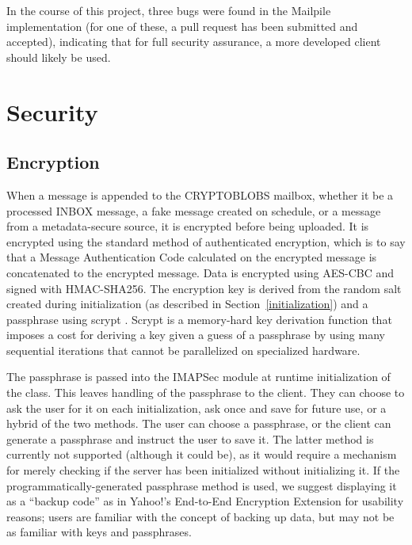 \documentclass[pageno]{jpaper}
\newcommand{\project}{IMAPSec }
\begin{document}
In the course of this project, three bugs were found in the Mailpile implementation (for one of these, a pull request has been submitted and accepted), indicating that for full security assurance, a more developed client should likely be used.




\section{Security}

\label{encryption}
\subsection{Encryption}

When a message is appended to the CRYPTOBLOBS mailbox, whether it be a processed INBOX message, a fake message created on schedule, or a message from a metadata-secure source, it is encrypted before being uploaded. It is encrypted using the standard method of authenticated encryption, which is to say that a Message Authentication Code calculated on the encrypted message is concatenated to the encrypted message. Data is encrypted using AES-CBC and signed with HMAC-SHA256. The encryption key is derived from the random salt created during initialization (as described in Section~\ref{initialization}) and a passphrase using scrypt \cite{percival2009stronger}. Scrypt is a memory-hard key derivation function that imposes a cost for deriving a key given a guess of a passphrase by using many sequential iterations that cannot be parallelized on specialized hardware.

The passphrase is passed into the \project module at runtime initialization of the class. This leaves handling of the passphrase to the client. They can choose to ask the user for it on each initialization, ask once and save for future use, or a hybrid of the two methods. The user can choose a passphrase, or the client can generate a passphrase and instruct the user to save it. The latter method is currently not supported (although it could be), as it would require a mechanism for merely checking if the server has been initialized without initializing it. If the programmatically-generated passphrase method is used, we suggest displaying it as a ``backup code'' as in Yahoo!'s End-to-End Encryption Extension \cite{yahoo} for usability reasons; users are familiar with the concept of backing up data, but may not be as familiar with keys and passphrases.
\end{document}
